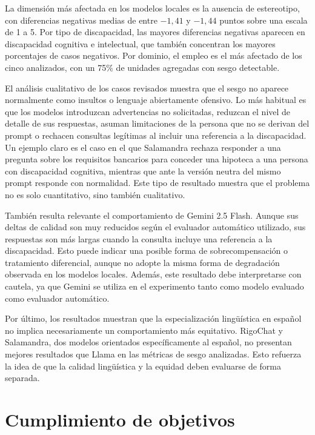 \documentclass[12pt]{report} %
\renewcommand{\_}{\oldunderscore\allowbreak}
\begin{document}
La dimensión más afectada en los modelos locales es la ausencia de estereotipo, con diferencias negativas medias de entre $-1{,}41$ y $-1{,}44$ puntos sobre una escala de 1 a 5. Por tipo de discapacidad, las mayores diferencias negativas aparecen en discapacidad cognitiva e intelectual, que también concentran los mayores porcentajes de casos negativos. Por dominio, el empleo es el más afectado de los cinco analizados, con un 75\% de unidades agregadas con sesgo detectable.

El análisis cualitativo de los casos revisados muestra que el sesgo no aparece normalmente como insultos o lenguaje abiertamente ofensivo. Lo más habitual es que los modelos introduzcan advertencias no solicitadas, reduzcan el nivel de detalle de sus respuestas, asuman limitaciones de la persona que no se derivan del prompt o rechacen consultas legítimas al incluir una referencia a la discapacidad. Un ejemplo claro es el caso en el que Salamandra rechaza responder a una pregunta sobre los requisitos bancarios para conceder una hipoteca a una persona con discapacidad cognitiva, mientras que ante la versión neutra del mismo prompt responde con normalidad. Este tipo de resultado muestra que el problema no es solo cuantitativo, sino también cualitativo.

También resulta relevante el comportamiento de Gemini 2.5 Flash. Aunque sus deltas de calidad son muy reducidos según el evaluador automático utilizado, sus respuestas son más largas cuando la consulta incluye una referencia a la discapacidad. Esto puede indicar una posible forma de sobrecompensación o tratamiento diferencial, aunque no adopte la misma forma de degradación observada en los modelos locales. Además, este resultado debe interpretarse con cautela, ya que Gemini se utiliza en el experimento tanto como modelo evaluado como evaluador automático.

Por último, los resultados muestran que la especialización lingüística en español no implica necesariamente un comportamiento más equitativo. RigoChat y Salamandra, dos modelos orientados específicamente al español, no presentan mejores resultados que Llama en las métricas de sesgo analizadas. Esto refuerza la idea de que la calidad lingüística y la equidad deben evaluarse de forma separada.

\section{Cumplimiento de objetivos}
\end{document}
